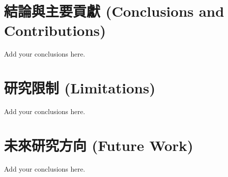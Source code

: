 \section{結論與主要貢獻 (Conclusions and Contributions)}
Add your conclusions here.

\section{研究限制 (Limitations)}
Add your conclusions here.

\section{未來研究方向 (Future Work)}
Add your conclusions here.